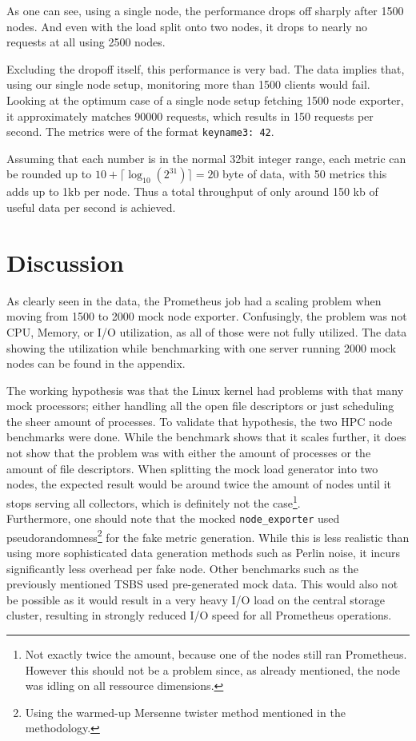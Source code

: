 As one can see, using a single node, the performance drops off sharply after 1500 nodes. And even with the load split onto two nodes, it drops to nearly no requests at all using 2500 nodes. 

Excluding the dropoff itself, this performance is very bad. The data implies that, using our single node setup, monitoring more than 1500 clients would fail. Looking at the optimum case of a single node setup fetching 1500 node exporter, it approximately matches 90000 requests, which results in 150 requests per second. The metrics were of the format \texttt{keyname3: 42}. 

Assuming that each number is in the normal 32bit integer range, each metric can be rounded up to $10+\lceil\log_{10}(2^{31})\rceil = 20$ byte of data, with 50 metrics this adds up to 1kb per node. Thus a total throughput of only around 150 kb of useful data per second is achieved.


\section{Discussion}
As clearly seen in the data, the Prometheus job had a scaling problem when moving from 1500 to 2000 mock node exporter. Confusingly, the problem was not CPU, Memory, or I/O utilization, as all of those were not fully utilized. The data showing the utilization while benchmarking with one server running 2000 mock nodes can be found in the appendix.

The working hypothesis was that the Linux kernel had problems with that many mock processors; either handling all the open file descriptors or just scheduling the sheer amount of processes. To validate that hypothesis, the two \ac{HPC} node benchmarks were done. While the benchmark shows that it scales further, it does not show that the problem was with either the amount of processes or the amount of file descriptors. When splitting the mock load generator into two nodes, the expected result would be around twice the amount of nodes until it stops serving all collectors, which is definitely not the case\footnote{Not exactly twice the amount, because one of the nodes still ran Prometheus. However this should not be a problem since, as already mentioned, the node was idling on all ressource dimensions.}.\\

Furthermore, one should note that the mocked \texttt{node\_exporter} used pseudorandomness\footnote{Using the warmed-up Mersenne twister method mentioned in the methodology.} for the fake metric generation. While this is less realistic than using more sophisticated data generation methods such as Perlin noise, it incurs significantly less overhead per fake node. Other benchmarks such as the previously mentioned \ac{TSBS} used pre-generated mock data. This would also not be possible as it would result in a very heavy I/O load on the central storage cluster, resulting in strongly reduced I/O speed for all Prometheus operations.\\

